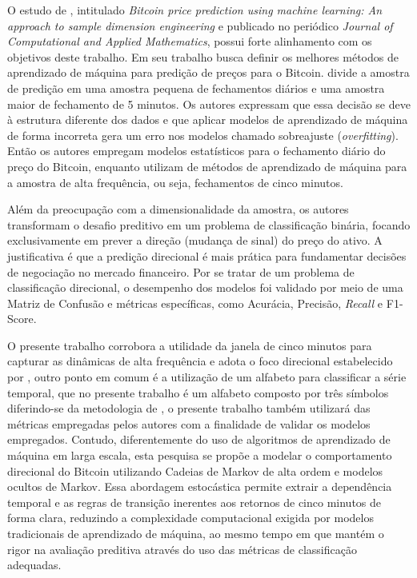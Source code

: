 \documentclass[
    12pt,                %
    openright,           %
    oneside,             %
    a4paper,             %
    english,             %
    brazil               %
]{abntex2}
\begin{document}
O estudo de , intitulado \textit{Bitcoin price prediction using machine learning: An approach
to sample dimension engineering} e publicado no periódico \textit{Journal of Computational and Applied Mathematics}, possui forte alinhamento com os objetivos deste trabalho. Em seu trabalho  busca definir os melhores métodos de aprendizado de máquina para predição de preços para o Bitcoin.  divide a amostra de predição em uma amostra pequena de fechamentos diários e uma amostra maior de fechamento de 5 minutos. Os autores expressam que essa decisão se deve à estrutura diferente dos dados e que aplicar modelos de aprendizado de máquina de forma incorreta gera um erro nos modelos chamado sobreajuste (\textit{overfitting}). Então os autores empregam modelos estatísticos para o fechamento diário do preço do Bitcoin, enquanto utilizam de métodos de aprendizado de máquina para a amostra de alta frequência, ou seja, fechamentos de cinco minutos. 

Além da preocupação com a dimensionalidade da amostra, os autores transformam o desafio preditivo em um problema de classificação binária, focando exclusivamente em prever a direção (mudança de sinal) do preço do ativo. A justificativa é que a predição direcional é mais prática para fundamentar decisões de negociação no mercado financeiro. Por se tratar de um problema de classificação direcional, o desempenho dos modelos foi validado por meio de uma Matriz de Confusão e métricas específicas, como Acurácia, Precisão, \textit{Recall} e F1-Score. 

O presente trabalho corrobora a utilidade da janela de cinco minutos para capturar as dinâmicas de alta frequência e adota o foco direcional estabelecido por , outro ponto em comum é a utilização de um alfabeto para classificar a série temporal, que no presente trabalho é um alfabeto composto por três símbolos diferindo-se da metodologia de , o presente trabalho também utilizará das métricas empregadas pelos autores com a finalidade de validar os modelos empregados. Contudo, diferentemente do uso de algoritmos de aprendizado de máquina em larga escala, esta pesquisa se propõe a modelar o comportamento direcional do Bitcoin utilizando Cadeias de Markov de alta ordem e modelos ocultos de Markov. Essa abordagem estocástica permite extrair a dependência temporal e as regras de transição inerentes aos retornos de cinco minutos de forma clara, reduzindo a complexidade computacional exigida por modelos tradicionais de aprendizado de máquina, ao mesmo tempo em que mantém o rigor na avaliação preditiva através do uso das métricas de classificação adequadas. 
\end{document}
